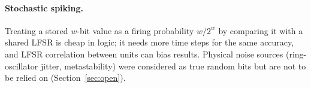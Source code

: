 \paragraph{Stochastic spiking.} Treating a stored $w$-bit value as a firing probability $w/2^w$ by comparing it with a shared LFSR is cheap in logic; it needs more time steps for the same accuracy, and LFSR correlation between units can bias results. Physical noise sources (ring-oscillator jitter, metastability) were considered as true random bits but are not to be relied on (Section~\ref{sec:open}). 
